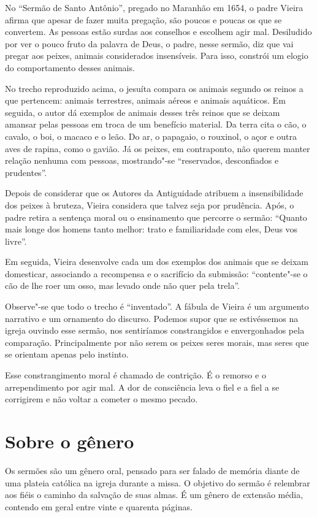 No ``Sermão de Santo Antônio'', pregado no Maranhão em 1654, o padre
Vieira afirma que apesar de fazer muita pregação, são poucos e poucas os
que se convertem. As pessoas estão surdas aos conselhos e escolhem agir
mal. Desiludido por ver o pouco fruto da palavra de Deus, o padre, nesse
sermão, diz que vai pregar aos peixes, animais considerados insensíveis.
Para isso, constrói um elogio do comportamento desses animais.

No trecho reproduzido acima, o jesuíta compara os animais segundo os
reinos a que pertencem: animais terrestres, animais aéreos e animais
aquáticos. Em seguida, o autor dá exemplos de animais desses três reinos
que se deixam amansar pelas pessoas em troca de um benefício material.
Da terra cita o cão, o cavalo, o boi, o macaco e o leão. Do ar, o
papagaio, o rouxinol, o açor e outra aves de rapina, como o gavião. Já
os peixes, em contraponto, não querem manter relação nenhuma com
pessoas, mostrando"-se ``reservados, desconfiados e prudentes''.

Depois de considerar que os Autores da Antiguidade atribuem a
insensibilidade dos peixes à bruteza, Vieira considera que talvez seja
por prudência. Após, o padre retira a sentença moral ou o ensinamento
que percorre o sermão: ``Quanto mais longe dos homens tanto melhor:
trato e familiaridade com eles, Deus vos livre''.

Em seguida, Vieira desenvolve cada um dos exemplos dos animais que se
deixam domesticar, associando a recompensa e o sacrifício da submissão:
``contente"-se o cão de lhe roer um osso, mas levado onde não quer pela
trela''.

Observe"-se que todo o trecho é ``inventado''. A fábula de Vieira é um
argumento narrativo e um ornamento do discurso. Podemos supor que se
estivéssemos na igreja ouvindo esse sermão, nos sentiríamos
constrangidos e envergonhados pela comparação. Principalmente por não
serem os peixes seres morais, mas seres que se orientam apenas pelo
instinto.

Esse constrangimento moral é chamado de contrição. É o remorso e o
arrependimento por agir mal. A dor de consciência leva o fiel e a fiel a
se corrigirem e não voltar a cometer o mesmo pecado.


\section{Sobre o gênero}

Os sermões são um gênero oral, pensado para ser falado de memória diante
de uma plateia católica na igreja durante a missa. O objetivo do sermão
é relembrar aos fiéis o caminho da salvação de suas almas. É um gênero
de extensão média, contendo em geral entre vinte e quarenta páginas.

